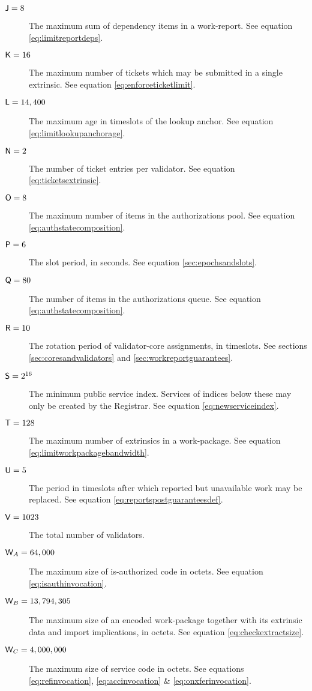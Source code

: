 \begin{description}
  \item[$\mathsf{J} = 8$] The maximum sum of dependency items in a work-report. See equation \ref{eq:limitreportdeps}.
  \item[$\mathsf{K} = 16$] The maximum number of tickets which may be submitted in a single extrinsic. See equation \ref{eq:enforceticketlimit}.
  \item[$\mathsf{L} = 14,400$] The maximum age in timeslots of the lookup anchor. See equation \ref{eq:limitlookupanchorage}.
  \item[$\mathsf{N} = 2$] The number of ticket entries per validator. See equation \ref{eq:ticketsextrinsic}.
  \item[$\mathsf{O} = 8$] The maximum number of items in the authorizations pool. See equation \ref{eq:authstatecomposition}.
  \item[$\mathsf{P} = 6$] The slot period, in seconds. See equation \ref{sec:epochsandslots}.
  \item[$\mathsf{Q} = 80$] The number of items in the authorizations queue. See equation \ref{eq:authstatecomposition}.
  \item[$\mathsf{R} = 10$] The rotation period of validator-core assignments, in timeslots. See sections \ref{sec:coresandvalidators} and \ref{sec:workreportguarantees}.
  \item[$\mathsf{S} = 2^{16}$] The minimum public service index. Services of indices below these may only be created by the Registrar. See equation \ref{eq:newserviceindex}.
  \item[$\mathsf{T} = 128$] The maximum number of extrinsics in a work-package. See equation \ref{eq:limitworkpackagebandwidth}.
  \item[$\mathsf{U} = 5$] The period in timeslots after which reported but unavailable work may be replaced. See equation \ref{eq:reportspostguaranteesdef}.
  \item[$\mathsf{V} = 1023$] The total number of validators.
  \item[$\mathsf{W}_A = 64,000$] The maximum size of is-authorized code in octets. See equation \ref{eq:isauthinvocation}.
  \item[$\mathsf{W}_B = 13,794,305$] The maximum size of an encoded work-package together with its extrinsic data and import implications, in octets. See equation \ref{eq:checkextractsize}.
  \item[$\mathsf{W}_C = 4,000,000$] The maximum size of service code in octets. See equations \ref{eq:refinvocation}, \ref{eq:accinvocation} \& \ref{eq:onxferinvocation}.

\end{description}

